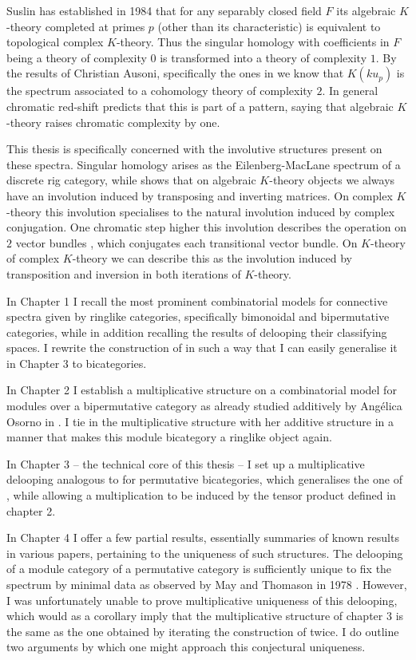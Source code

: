 Suslin has established in 1984 that for any separably closed field $F$ its algebraic 
$K$-theory completed at primes $p$ (other than its characteristic) is equivalent to
topological complex $K$-theory. Thus the singular homology with coefficients in $F$
being a theory of complexity $0$ is transformed into a theory of complexity $1$.
By the results of Christian Ausoni, specifically the ones in \cite{AuKku} we know
that $K(ku_p)$ is the spectrum associated to a cohomology theory of complexity $2$.
In general chromatic red-shift predicts that this is part of a pattern, saying that
algebraic $K$-theory raises chromatic complexity by one.

This thesis is specifically concerned with the involutive structures present on these
spectra. Singular homology arises as the Eilenberg-MacLane spectrum of a discrete
rig category, while \cite{Ri2010} shows that on algebraic $K$-theory objects we always
have an involution induced by transposing and inverting matrices. On complex $K$-theory
this involution specialises to the natural involution induced by complex conjugation.
One chromatic step higher this involution describes the operation on $2$ vector bundles
\cite{BDR2004}, which conjugates each transitional vector bundle. On $K$-theory of
complex $K$-theory we can describe this as the involution induced by transposition
and inversion in both iterations of $K$-theory.

In Chapter 1 I recall the most prominent combinatorial models for connective spectra given
by ringlike categories, specifically bimonoidal and bipermutative categories, while in
addition recalling the results of \cite{EM} delooping their classifying spaces. I rewrite
the construction of \cite{EM} in such a way that I can easily generalise it in Chapter 3 to
bicategories.

In Chapter 2 I establish a multiplicative structure on a combinatorial model for modules
over a bipermutative category as already studied additively by Ang\'elica Osorno in
\cite{Os}. I tie in the multiplicative structure with her additive structure in a manner
that makes this module bicategory a ringlike object again.

In Chapter 3 -- the technical core of this thesis -- I set up a multiplicative delooping
analogous to \cite{EM} for permutative bicategories, which generalises the one of \cite{Os},
while allowing a multiplication to be induced by the tensor product defined in chapter 2. 

In Chapter 4 I offer a few partial results, essentially summaries of known results in
various papers, pertaining to the uniqueness of such structures. The delooping of a
module category of a permutative category is sufficiently unique to fix the spectrum
by minimal data as observed by May and Thomason in 1978 \cite{MT1978}. However, I was
unfortunately unable to prove multiplicative uniqueness of this delooping, which would
as a corollary imply that the multiplicative structure of chapter 3 is the same as the
one obtained by iterating the construction of \cite{EM} twice. I do outline two
arguments by which one might approach this conjectural uniqueness.

